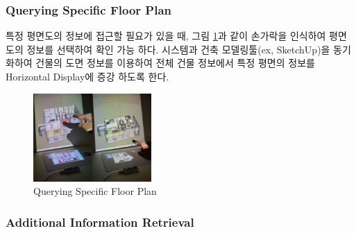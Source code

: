 \subsubsection{Querying Specific Floor Plan}
특정 평면도의 정보에 접근할 필요가 있을 때, 그림 \ref{fig:layer}과 같이 손가락을 인식하여 평면도의 정보를 선택하여 확인 가능 하다. 시스템과 건축 모델링툴(ex, SketchUp)을 동기화하여 건물의 도면 정보를 이용하여 전체 건물 정보에서 특정 평면의 정보를 Horizontal Display에 증강 하도록 한다. 
 \begin{figure}[h!]
\centering
\includegraphics[width=0.4\textwidth]{4-Interaction_Design/query_plane}
\caption{Querying Specific Floor Plan}
\label{fig:layer}
\end{figure}


\subsubsection{Additional Information Retrieval}

